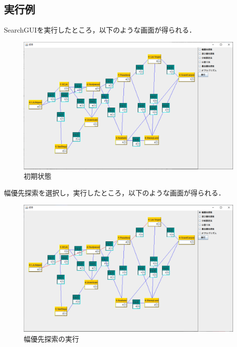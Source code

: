 \documentclass[12pt]{jarticle}
\begin{document}
\clearpage
\subsection{実行例}
SearchGUIを実行したところ，以下のような画面が得られる．

\begin{figure}[!hbt]
  	\begin{center}
  		\includegraphics[scale=0.50]{scs1.png}
	\end{center}
  	\caption{初期状態}
\end{figure}
\clearpage

幅優先探索を選択し，実行したところ，以下のような画面が得られる．

\begin{figure}[!hbt]
  	\begin{center}
  		\includegraphics[scale=0.50]{scs2.png}
	\end{center}
  	\caption{幅優先探索の実行}
\end{figure}
\clearpage
\end{document}
